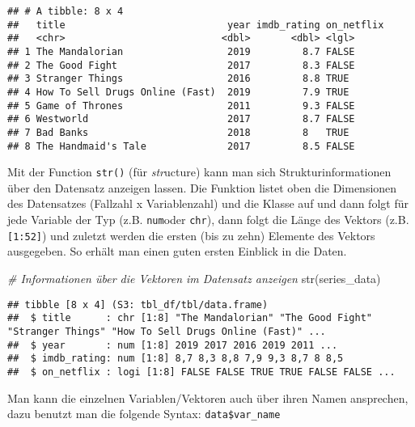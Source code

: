 \documentclass[
]{book}
\newenvironment{Shaded}{\begin{snugshade}}{\end{snugshade}}
\newcommand{\CommentTok}[1]{\textcolor[rgb]{0.56,0.35,0.01}{\textit{#1}}}
\newcommand{\FunctionTok}[1]{\textcolor[rgb]{0.00,0.00,0.00}{#1}}
\newcommand{\NormalTok}[1]{#1}
\newcommand{\SpecialCharTok}[1]{\textcolor[rgb]{0.00,0.00,0.00}{#1}}
\begin{document}
\begin{verbatim}
## # A tibble: 8 x 4
##   title                            year imdb_rating on_netflix
##   <chr>                           <dbl>       <dbl> <lgl>     
## 1 The Mandalorian                  2019         8.7 FALSE     
## 2 The Good Fight                   2017         8.3 FALSE     
## 3 Stranger Things                  2016         8.8 TRUE      
## 4 How To Sell Drugs Online (Fast)  2019         7.9 TRUE      
## 5 Game of Thrones                  2011         9.3 FALSE     
## 6 Westworld                        2017         8.7 FALSE     
## 7 Bad Banks                        2018         8   TRUE      
## 8 The Handmaid's Tale              2017         8.5 FALSE
\end{verbatim}

Mit der Function \texttt{str()} (für \emph{str}ucture) kann man sich Strukturinformationen über den Datensatz anzeigen lassen. Die Funktion listet oben die Dimensionen des Datensatzes (Fallzahl x Variablenzahl) und die Klasse auf und dann folgt für jede Variable der Typ (z.B. \texttt{num}oder \texttt{chr}), dann folgt die Länge des Vektors (z.B. \texttt{{[}1:52{]}}) und zuletzt werden die ersten (bis zu zehn) Elemente des Vektors ausgegeben. So erhält man einen guten ersten Einblick in die Daten.

\begin{Shaded}
\begin{Highlighting}[]
\CommentTok{\# Informationen über die Vektoren im Datensatz anzeigen}
\FunctionTok{str}\NormalTok{(series\_data)}
\end{Highlighting}
\end{Shaded}

\begin{verbatim}
## tibble [8 x 4] (S3: tbl_df/tbl/data.frame)
##  $ title      : chr [1:8] "The Mandalorian" "The Good Fight" "Stranger Things" "How To Sell Drugs Online (Fast)" ...
##  $ year       : num [1:8] 2019 2017 2016 2019 2011 ...
##  $ imdb_rating: num [1:8] 8,7 8,3 8,8 7,9 9,3 8,7 8 8,5
##  $ on_netflix : logi [1:8] FALSE FALSE TRUE TRUE FALSE FALSE ...
\end{verbatim}

Man kann die einzelnen Variablen/Vektoren auch über ihren Namen ansprechen, dazu benutzt man die folgende Syntax: \texttt{data\$var\_name}

\begin{Shaded}
\end{Shaded}
\end{document}
